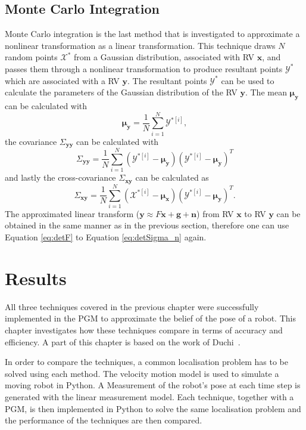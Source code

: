 \documentclass[12pt,oneside,openany,a4paper, %
afrikaans,english,
]{memoir}
\numberwithin{equation}{chapter}
\begin{document}
\section{Monte Carlo Integration}
Monte Carlo integration is the last method that is investigated to approximate a nonlinear transformation as a linear transformation. This technique draws $N$ random points $\mathcal{X}^*$ from a Gaussian distribution, associated with RV $\bm{x}$, and passes them through a nonlinear transformation to produce resultant points $\mathcal{Y}^*$ which are associated with a RV $\bm{y}$. The resultant points $\mathcal{Y}^*$ can be used to calculate the parameters of the Gaussian distribution of the RV $\bm{y}$. The mean $\bm{\mu_y}$ can be calculated with
\begin{equation}
\bm{\mu_y} =  \frac{1}{N}\sum_{i=1}^N\mathcal{Y}^{*[i]},
\end{equation}
the covariance $\Sigma_{\bm{yy}}$ can be calculated with
\begin{equation}
\Sigma_{\bm{yy}} = \frac{1}{N}\sum_{i=1}^N (\mathcal{Y}^{*[i]} - \bm{\mu_y})(\mathcal{Y}^{*[i]} - \bm{\mu_y})^T
\end{equation}
and lastly the cross-covariance $\Sigma_{\bm{xy}}$ can be calculated as
\begin{equation}
\Sigma_{\bm{xy}} = \frac{1}{N}\sum_{i=1}^N (\mathcal{X}^{*[i]} - \bm{\mu_x})(\mathcal{Y}^{*[i]} - \bm{\mu_y})^T.
\end{equation}
The approximated linear transform ($\bm{y} \approx F\bm{x} + \bm{g} + \bm{n}$) from RV $\bm{x}$ to RV $\bm{y}$ can be obtained in the same manner as in the previous section, therefore one can use Equation \ref{eq:detF} to Equation \ref{eq:detSigma_n} again.

\chapter{Results}
All three techniques covered in the previous chapter were successfully implemented in the PGM to approximate the belief of the pose of a robot. This chapter investigates how these techniques compare in terms of accuracy and efficiency. A part of this chapter is based on the work of Duchi~\cite{duchi}.

In order to compare the techniques, a common localisation problem has to be solved using each method. The velocity motion model is used to simulate a moving robot in Python. A Measurement of the robot's pose at each time step is generated with the linear measurement model. Each technique, together with a PGM, is then implemented in Python to solve the same localisation problem and the performance of the techniques are then compared.
\end{document}
